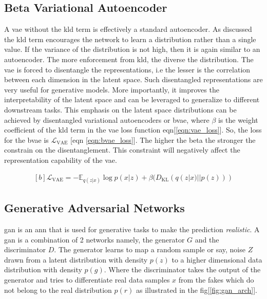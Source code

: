 \subsection{Beta Variational Autoencoder}

A \ac{vae} without the \ac{kld} term is effectively a standard autoencoder. As discussed the \ac{kld} term encourages the network to learn a distribution rather than a single value. If the variance of the distribution is not high, then it is again similar to an autoencoder. The more enforcement from \ac{kld}, the diverse the distribution. The \ac{vae} is forced to disentangle the representations, i.e the lesser is the correlation between each dimension in the latent space. Such disentangled representations are very useful for generative models. More importantly, it improves the interpretability of the latent space and can be leveraged to generalize to different downstream tasks. This emphasis on the latent space distributions can be achieved by disentangled variational autoencoders or \ac{bvae}, where $\beta$ is the weight coefficient of the \ac{kld} term in the \ac{vae} loss function eqn[\ref{eqn:vae_loss}]. So, the loss for the \ac{bvae} is $\mathcal{L}_{\mathrm{VAE}}$ [eqn \ref{eqn:bvae_loss}]. The higher the beta the stronger the constrain on the disentanglement. This constraint will negatively affect the representation capability of the \ac{vae}.

\begin{equation} \label{eqn:bvae_loss}
    \begin{gathered}[b]
        \mathcal{L}_{\mathrm{VAE}}=-\mathbb{E}_{q(z | x)} \log p(x | z) + \beta (D_{\mathrm{KL}}(q(z | x) || p(z)))
    \end{gathered}
\end{equation}

\subsection{Generative Adversarial Networks}
\ac{gan} is an \ac{ann} that is used for generative tasks to make the prediction \textit{realistic}. A \ac{gan} is a combination of 2 networks namely, the generator $G$ and the discriminator $D$. The generator learns to map a random sample or say, noise $Z$ drawn from a latent distribution with density $p(z)$ to a higher dimensional data distribution with density $p(g)$. Where the discriminator takes the output of the generator and tries to differentiate real data samples $x$ from the fakes which do not belong to the real distribution $p(r)$  as illustrated in the fig[\ref{fig:gan_arch}].


